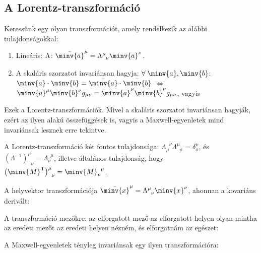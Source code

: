   \subsection{A Lorentz-transzformáció}
   
   Keressünk egy olyan transzformációt, amely rendelkezik az alábbi tulajdonságokkal:
   \begin{enumerate}
    \item Lineáris: $\Lambda\colon \bar{\minv{a}}^\mu=\Lambda^\mu_{\phantom{\mu}\nu} \minv{a}^\nu$.
    \item A skaláris szorzatot invariánsan hagyja: $\forall\; \minv{a},\minv{b}$: $\minv{a}\cdot \minv{b}=\bar{\minv{a}}\cdot\bar{\minv{b}}$ $\Leftrightarrow$ $\minv{a}^\mu \minv{b}^\nu g_{\mu\nu}=\bar{\minv{a}}^\mu \bar{\minv{b}}^\nu g_{\mu\nu}$, vagyis
   \end{enumerate}
   Ezek a Lorentz-transzformációk.
   Mivel a skaláris szorzatot invariánsan hagyják, ezért az ilyen alakú összefüggések is, vagyis a Maxwell-egyenletek mind invariánsak lesznek erre tekintve. 
   
   A Lorentz-transzformáció két fontos tulajdonsága: $\Lambda_\mu^{\phantom{\mu}\nu}\Lambda^\mu_{\phantom{\mu}\sigma}=\delta_\sigma^\nu$, és $(\Lambda^{-1})^\mu_{\phantom{\mu}\nu}=\Lambda_\nu^{\phantom{\nu}\mu}$, illetve általános tulajdonság, hogy $\big(\minv{M}^\text{T}\big)^\mu_{\phantom{\mu}\nu}=\minv{M}^{\phantom{\nu}\mu}_{\nu}$.
   
   A helyvektor transzformációja $\bar{\minv{x}}^\mu=\Lambda^\mu_{\phantom{\mu}\nu} \minv{x}^\nu$, ahonnan a kovariáns derivált:
   
   A transzformáció mezőkre: az elforgatott mező az elforgatott helyen olyan mintha az eredeti mezőt az eredeti helyen nézném, és elforgatnám az egészet:
   
   A Maxwell-egyenletek tényleg invariánsak egy ilyen transzformációra:
   
